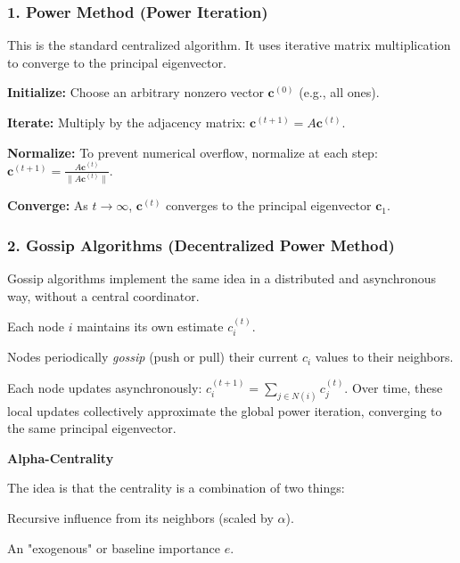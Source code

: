 \subsubsection*{1. Power Method (Power Iteration)}
This is the standard centralized algorithm. It uses iterative matrix multiplication to converge to the principal eigenvector.

\begin{tightitemize}
    \item \textbf{Initialize:} Choose an arbitrary nonzero vector $\mathbf{c}^{(0)}$ (e.g., all ones).
    \item \textbf{Iterate:} Multiply by the adjacency matrix:
    $
    \mathbf{c}^{(t+1)} = A \mathbf{c}^{(t)}.
    $
    \item \textbf{Normalize:} To prevent numerical overflow, normalize at each step:
    $
    \mathbf{c}^{(t+1)} = \frac{A \mathbf{c}^{(t)}}{\|A \mathbf{c}^{(t)}\|}.
    $
    \item \textbf{Converge:} As $t \to \infty$, $\mathbf{c}^{(t)}$ converges to the principal eigenvector $\mathbf{c}_1$.  

\end{tightitemize}

\subsubsection*{2. Gossip Algorithms (Decentralized Power Method)}
Gossip algorithms implement the same idea in a distributed and asynchronous way, without a central coordinator.

\begin{tightitemize}
    \item Each node $i$ maintains its own estimate $c_i^{(t)}$.
    \item Nodes periodically \emph{gossip} (push or pull) their current $c_i$ values to their neighbors.
    \item Each node updates asynchronously:
    $
    c_i^{(t+1)} = \sum_{j \in N(i)} c_j^{(t)}.
    $
    Over time, these local updates collectively approximate the global power iteration, converging to the same principal eigenvector.
\end{tightitemize}

\textbf{Alpha-Centrality}

The idea is that the centrality is a combination of two things:

\begin{tightitemize}
    \item Recursive influence from its neighbors (scaled by $\alpha$).
    \item An "exogenous" or baseline importance $e$.
\end{tightitemize}

